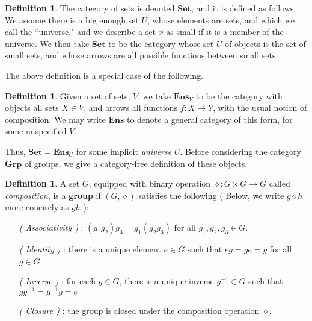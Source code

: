 \documentclass[12pt]{article}
\numberwithin{equation}{section}
\theoremstyle{definition}
\newtheorem{defn}[thm]{Definition}
\newcommand{		\set		}	{	{\mathbf{Set}}		}
\newcommand{		\ens		}	{	{\mathbf{Ens}}		}
\newcommand{		\grp		}	{	{\mathbf{Grp}}		}
\newcommand{		\1		}	{	\bm{1}					}%
\begin{document}
\vspace{5mm}

\begin{defn}
The category of sets is denoted $\set$, and it is defined as follows. We assume there is a big enough set $U$, whose elements are sets, and which we call the ``universe," and we describe a set $x$ as small if it is a member of the universe. We then take $\set$ to be the category whose set $U$ of objects is the set of small sets, and whose arrows are all possible functions between small sets. 
 \end{defn}

 
 The above definition is a special case of the following.
 
 \begin{defn} Given a set of sets, $V$, we take $\ens_V$ to be the category with objects all sets $X \in V$, and arrows all functions $f: X \to Y$, with the usual notion of composition. We may write $\ens$ to denote a general category of this form, for some unspecified $V$. 
 \end{defn}
 
Thus, $\set = \ens_U$ for some implicit \emph{universe} $U$. Before considering the category $\grp$ of groups, we give a category-free definition of these objects. 
 
 \begin{defn}
A set $G$, equipped with binary operation $\diamond : G \times G \to G$  called \emph{composition}, is a \textbf{group} if $(G,\diamond)$ satisfies the following ( Below, we write $g \diamond h$ more concisely as $gh$ ):
\begin{itemize}
   \item[\emph{( Associativity )}]: $(g_1 g_2) g_3 = g_1 (g_2 g_3)$ for all $g_1, g_2, g_3 \in G$.
    
    \item[\emph{( Identity )}] : there is a unique element $e \in G$ such that $eg = ge = g$ for all $g \in G$.
    
    \item[\emph{( Inverse )}] : for each $g \in G$, there is a unique inverse $g^{-1} \in G$ such that $gg^{-1} = g^{-1} g = e$
    
    \item[\emph{( Closure )}] : the group is closed under the composition operation $\diamond$. 
\end{itemize}
\end{defn}
\end{document}
